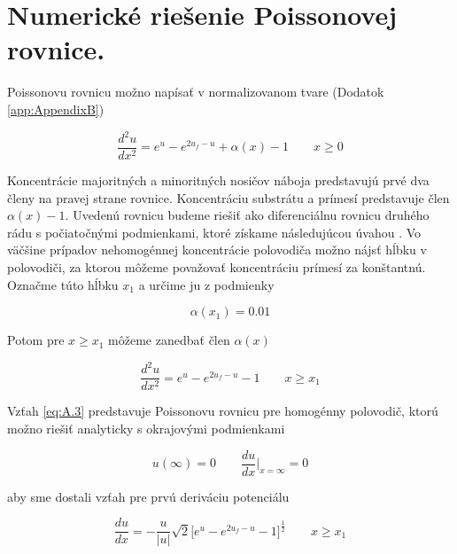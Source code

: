 
\chapter{Numerické riešenie Poissonovej rovnice.} %

\label{app:AppendixA} %


Poissonovu rovnicu možno napísať v normalizovanom tvare (Dodatok
\ref{app:AppendixB})

\begin{equation}\label{eq:A.1}
{\frac{d^2u}{dx^2} = e^u - e^{2u_f-u} + \alpha(x) - 1} \qquad {x\ge0}
\end{equation}

Koncentrácie majoritných a minoritných nosičov náboja predstavujú prvé
dva členy na pravej strane rovnice. Koncentráciu substrátu a prímesí
predstavuje člen $\alpha(x)-1$. Uvedenú rovnicu budeme riešiť ako
diferenciálnu rovnicu druhého rádu s počiatočnými podmienkami, ktoré
získame následujúcou úvahou \cite{App.1}. Vo väčšine prípadov
nehomogénnej koncentrácie polovodiča možno nájsť hĺbku v polovodiči,
za ktorou môžeme považovať koncentráciu prímesí za konštantnú. Označme
túto hĺbku $x_1$ a určime ju z podmienky

\begin{equation}\label{eq:A.2}
{\alpha(x_1)  =  0.01}
\end{equation}

Potom pre $x\ge{x_1}$  môžeme zanedbať člen $\alpha(x)$

\begin{equation}\label{eq:A.3}
{\frac{d^2u}{dx^2} = e^u -  e^{2u_f-u}  - 1} \qquad {x\ge{x_1}}
\end{equation}

Vzťah \ref{eq:A.3} predstavuje
Poissonovu rovnicu pre homogénny polovodič, ktorú možno riešiť
analyticky s okrajovými podmienkami

\begin{equation}\label{eq:A.4}
u(\infty) = 0 \qquad \frac{du}{dx}\Big\rvert_{x=\infty} = 0
\end{equation}

aby sme dostali vzťah pre prvú deriváciu potenciálu

\begin{equation}\label{eq:A.5}
\frac{du}{dx} = - \frac{u}{|u|} \sqrt{2} \Big[e^u - e^{2u_f-u} - 1
  \Big]^{\frac{1}{2}} \qquad {x\ge{x_1}}
\end{equation}

